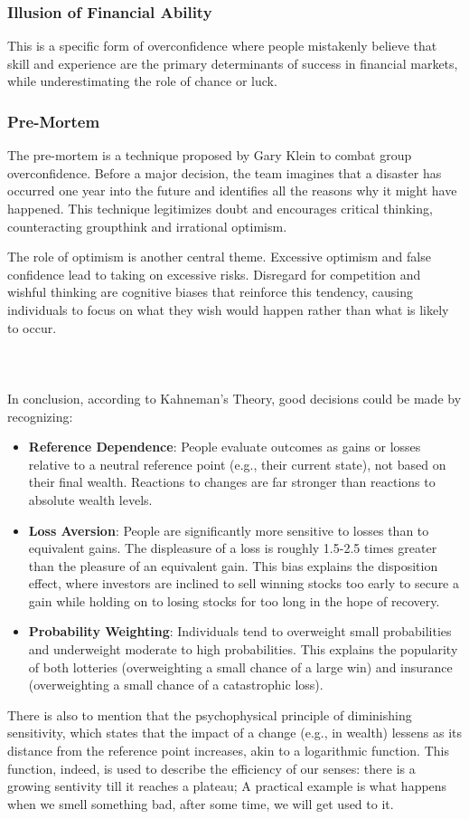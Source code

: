 \documentclass{article}
\begin{document}
\subsubsection*{Illusion of Financial Ability}
This is a specific form of overconfidence where people mistakenly believe that skill and experience are the primary determinants of success in financial markets, while underestimating the role of chance or luck.

\subsubsection*{Pre-Mortem}
The pre-mortem is a technique proposed by Gary Klein to combat group overconfidence. Before a major decision, the team imagines that a disaster has occurred one year into the future and identifies all the reasons why it might have happened. This technique legitimizes doubt and encourages critical thinking, counteracting groupthink and irrational optimism.

The role of optimism is another central theme. Excessive optimism and false confidence lead to taking on excessive risks. Disregard for competition and wishful thinking are cognitive biases that reinforce this tendency, causing individuals to focus on what they wish would happen rather than what is likely to occur.\\\\\\\\
In conclusion, according to Kahneman's Theory, good decisions could be made by recognizing:
\begin{itemize}
\item \textbf{Reference Dependence}: People evaluate outcomes as gains or losses relative to a neutral reference point (e.g., their current state), not based on their final wealth. Reactions to changes are far stronger than reactions to absolute wealth levels.
\item \textbf{Loss Aversion}: People are significantly more sensitive to losses than to equivalent gains. The displeasure of a loss is roughly 1.5-2.5 times greater than the pleasure of an equivalent gain. This bias explains the disposition effect, where investors are inclined to sell winning stocks too early to secure a gain while holding on to losing stocks for too long in the hope of recovery.
\item \textbf{Probability Weighting}: Individuals tend to overweight small probabilities and underweight moderate to high probabilities. This explains the popularity of both lotteries (overweighting a small chance of a large win) and insurance (overweighting a small chance of a catastrophic loss).
\end{itemize}
There is also to mention that the psychophysical principle of diminishing sensitivity, which states that the impact of a change (e.g., in wealth) lessens as its distance from the reference point increases, akin to a logarithmic function. This function, indeed, is used to describe the efficiency of our senses: there is a growing sentivity till it reaches a plateau; A practical example is what happens when we smell something bad, after some time, we will get used to it.
\end{document}
